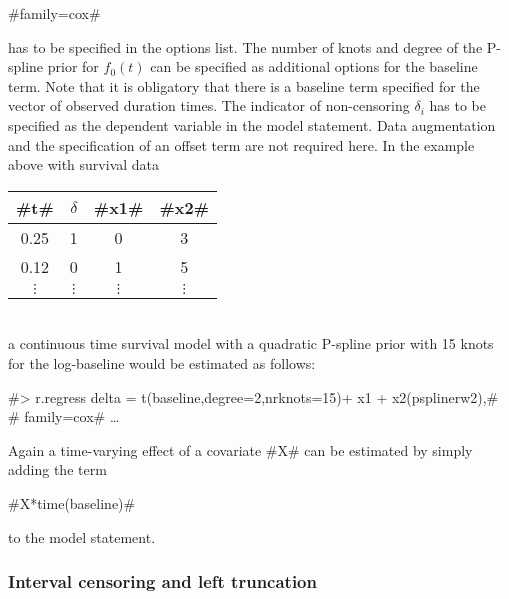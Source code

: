 #family=cox#

has to be specified in the options list. The number of knots and
degree of the P-spline prior for $f_0(t)$ can be specified as
additional options for the baseline term. Note that it is obligatory
that there is a baseline term specified for the vector of observed
duration times. The indicator of non-censoring $\delta_i$ has to be
specified as the dependent variable in the model statement. Data
augmentation and the specification of an offset term are not
required here. In the example above with survival data

\vspace{0.5cm}

\begin{tabular}{c|c|c|c}
  #t# &   $\delta$ &  #x1# &  #x2#\\\hline\hline
0.25  &  1  &    0  &  3\\\hline 0.12  &  0  &    1  &  5\\\hline
$\vdots$ & $\vdots$ & $\vdots$ & $\vdots$ \\
\end{tabular}
\vspace{0.5cm}\\
a continuous time survival model with a quadratic P-spline prior
with 15 knots for the log-baseline would be estimated as follows:

 #> r.regress delta = t(baseline,degree=2,nrknots=15)+ x1 + x2(psplinerw2),#\\
 #  family=cox# \ldots

Again a time-varying effect of a covariate #X# can be estimated by
simply adding the term

#X*time(baseline)#

to the model statement.

\subsubsection*{Interval censoring and left truncation}
  

